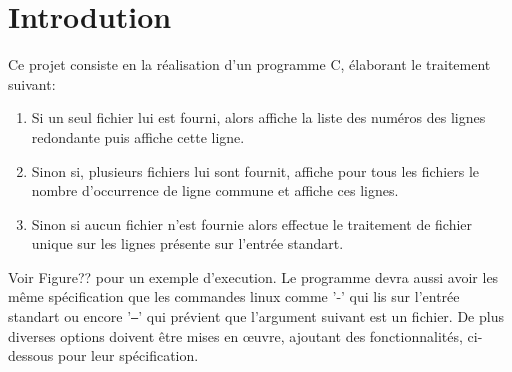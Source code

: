 \documentclass[12pt]{article}
\begin{document}
    \section{Introdution}
        Ce projet consiste en la réalisation d'un programme C, élaborant le 
        traitement suivant:
        \begin{enumerate}
            \item[] Si un seul fichier lui est fourni, alors affiche la liste 
            des numéros des lignes redondante puis affiche cette ligne.
            \item[] Sinon si, plusieurs fichiers lui sont fournit, affiche pour
             tous les fichiers le nombre d'occurrence de ligne commune et 
             affiche ces lignes.
            \item[] Sinon si aucun fichier n'est fournie alors effectue le 
            traitement de fichier unique sur les lignes présente sur l'entrée 
            standart.
        \end{enumerate}
        Voir Figure?? pour un exemple d'execution. Le programme devra aussi 
        avoir les même spécification que les commandes linux comme '-' qui 
        lis sur l'entrée standart ou encore '\texttt{--}' qui prévient que 
        l'argument suivant est un fichier.
       De plus diverses options doivent être mises en œuvre, ajoutant des 
       fonctionnalités, ci-dessous pour leur spécification.
       
    \begin{figure}[!htbp]
        \centering
        
        \label{exemple-ex}
    \end{figure}
\end{document}
